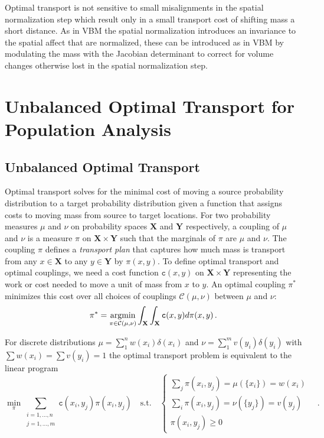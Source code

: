 \documentclass{llncs}
\newcommand{\cost}[0]{\mathtt{c}}
\newcommand{\coupling}[0]{\pi}
\def\argmin{\mathop{\rm argmin}}
\newcommand{\Xsp}{{\mathbf{X}}}
\newcommand{\Ysp}{{\mathbf{Y}}}
\begin{document}
Optimal transport is not sensitive to small misalignments in the spatial
normalization step which result only in a small transport cost of shifting mass
a short distance. As in VBM the spatial normalization introduces an invariance
to the spatial affect that are normalized, these can be introduced as in VBM by
modulating the mass with the Jacobian determinant to correct for volume changes
otherwise lost in the spatial normalization step. 





\section{Unbalanced Optimal Transport for Population Analysis}

\subsection{Unbalanced Optimal Transport}
Optimal transport solves for the minimal cost of moving a source probability
distribution to a target probability distribution given a function that assigns
costs to moving mass from source to target locations. For two probability
measures  $\mu$ and $\nu$ on probability spaces ${\Xsp}$ and ${\Ysp}$
respectively, a coupling of $\mu$ and $\nu$ is a measure $\coupling$ on
${\Xsp}\times{\Ysp}$ such that the marginals of $\coupling$ are $\mu$ and
$\nu$. The coupling $\coupling$ defines a {\em transport plan} that captures
how much mass is transport from any $x \in \Xsp$ to  any $y \in \Ysp$ by
$\coupling(x, y)$. To define optimal transport and optimal couplings, we need
a cost function $\cost(x,y)$ on ${\Xsp}\times{\Ysp}$ representing the work or
cost needed to move a unit of mass from $x$ to $y$. An optimal coupling
$\coupling^*$ minimizes this cost over all choices of couplings
$\mathcal{C}(\mu,\nu)$ between
$\mu$ and $\nu$: 
\begin{equation}
  \coupling^*= \argmin_{\coupling\in\mathcal{C}(\mu,\nu)} \int_{{\Xsp}}\int_{{\Xsp}}
\cost(x,y)  d\coupling(x,y) \,.  
\end{equation}

For discrete distributions $\mu = \sum_1^n w(x_i) \delta(x_i)$ and $ \nu =
\sum_1^m v(y_i) \delta(y_i)$ with $\sum w(x_i) = \sum v(y_i) = 1$ the optimal
transport problem is equivalent to the linear program 
\begin{equation}
\min_\coupling \sum_{\substack{i=1,\dots,n\\ j=1,\dots,m}} 
      \cost(x_i, y_j) \coupling(x_i, y_j) \quad \text{s.t.}\quad 
\begin{cases}
\sum_j \coupling(x_i, y_j) = \mu(\{x_i\}) = w(x_i) & \\ 
\sum_i \coupling(x_i, y_j) = \nu(\{y_j\}) = v(y_j) & \\
 \coupling(x_i,y_j)\ge 0
\end{cases}\,.
\label{e:LPformulation}
\end{equation} 
\end{document}
